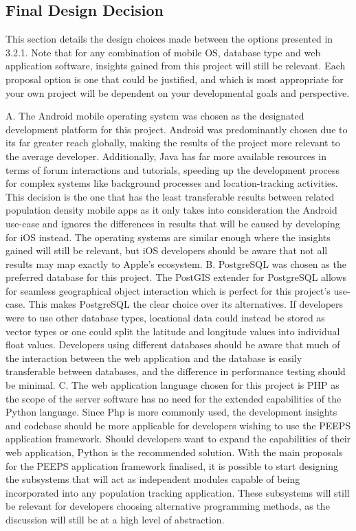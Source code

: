 \subsection{Final Design Decision}

This section details the design choices made between the options presented in 3.2.1. Note that for any combination of mobile OS, database type and web application software, insights gained from this project will still be relevant. Each proposal option is one that could be justified, and which is most appropriate for your own project will be dependent on your developmental goals and perspective. 

A. The Android mobile operating system was chosen as the designated development platform for this project. Android was predominantly chosen due to its far greater reach globally, making the results of the project more relevant to the average developer. Additionally, Java has far more available resources in terms of forum interactions and tutorials, speeding up the development process for complex systems like background processes and location-tracking activities. This decision is the one that has the least transferable results between related population density mobile apps as it only takes into consideration the Android use-case and ignores the differences in results that will be caused by developing for iOS instead. The operating systems are similar enough where the insights gained will still be relevant, but iOS developers should be aware that not all results may map exactly to Apple’s ecosystem.
B. PostgreSQL was chosen as the preferred database for this project. The PostGIS extender for PostgreSQL allows for seamless geographical object interaction which is perfect for this project’s use-case. This makes PostgreSQL the clear choice over its alternatives. If developers were to use other database types, locational data could instead be stored as vector types or one could split the latitude and longitude values into individual float values. Developers using different databases should be aware that much of the interaction between the web application and the database is easily transferable between databases, and the difference in performance testing should be minimal.
C. The web application language chosen for this project is PHP as the scope of the server software has no need for the extended capabilities of the Python language. Since Php is more commonly used, the development insights and codebase should be more applicable for developers wishing to use the PEEPS application framework. Should developers want to expand the capabilities of their web application, Python is the recommended solution.
With the main proposals for the PEEPS application framework finalised, it is possible to start designing the subsystems that will act as independent modules capable of being incorporated into any population tracking application. These subsystems will still be relevant for developers choosing alternative programming methods, as the discussion will still be at a high level of abstraction. 

